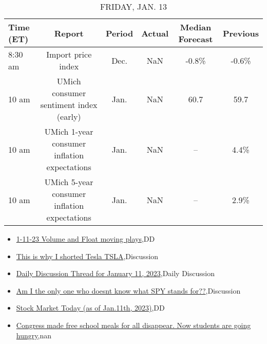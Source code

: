 \documentclass{article}%
\begin{document}
%


\begin{table}[htbp]%
\caption{FRIDAY, JAN. 13}%
\centering%
\begin{adjustbox}{width=1\textwidth}%
\begin{tabular}{lccccc}
\toprule
Time (ET) &                                       Report & Period & Actual & Median Forecast & Previous \\
\midrule
  8:30 am &                           Import price index &   Dec. &    NaN &           -0.8\% &    -0.6\% \\
    10 am &       UMich consumer sentiment index (early) &   Jan. &    NaN &            60.7 &     59.7 \\
    10 am & UMich 1-year consumer inflation expectations &   Jan. &    NaN &              -- &     4.4\% \\
    10 am & UMich 5-year consumer inflation expectations &   Jan. &    NaN &              -- &     2.9\% \\
\bottomrule
\end{tabular}
%
\end{adjustbox}%
\end{table}

%
\begin{itemize}%
\item%
\href{https://reddit.com/r/wallstreetbets/comments/1093m61/11123\_volume\_and\_float\_moving\_plays/}{1-11-23 Volume and Float moving plays},DD%
\item%
\href{https://reddit.com/r/wallstreetbets/comments/1092iiy/this\_is\_why\_i\_shorted\_tesla\_tsla/}{This is why I shorted Tesla TSLA},Discussion%
\item%
\href{https://reddit.com/r/wallstreetbets/comments/10920p1/daily\_discussion\_thread\_for\_january\_11\_2023/}{Daily Discussion Thread for January 11, 2023},Daily Discussion%
\item%
\href{https://reddit.com/r/wallstreetbets/comments/10916fg/am\_i\_the\_only\_one\_who\_doesnt\_know\_what\_spy\_stands/}{Am I the only one who doesnt know what SPY stands for??},Discussion%
\item%
\href{https://reddit.com/r/wallstreetbets/comments/1090ik1/stock\_market\_today\_as\_of\_jan11th\_2023/}{Stock Market Today (as of Jan.11th, 2023)},DD%
\item%
\href{https://reddit.com/r/Economics/comments/1091y8z/congress\_made\_free\_school\_meals\_for\_all\_disappear/}{Congress made free school meals for all disappear. Now students are going hungry},nan%
\end{itemize}%
\end{document}
